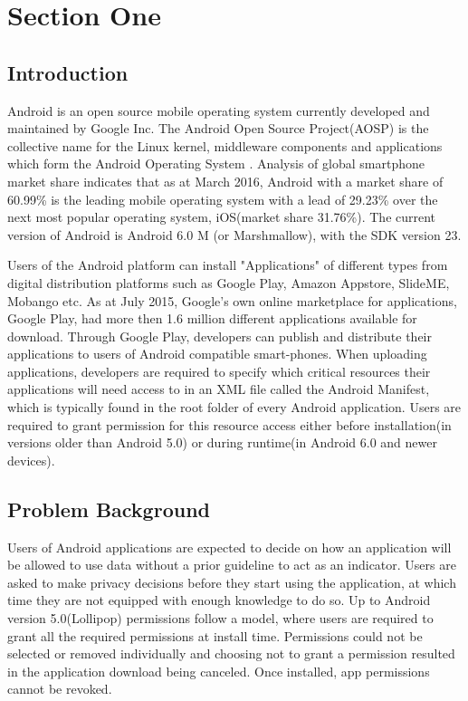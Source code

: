 

\chapter{Section One} \label{cha:intro}
\section{Introduction}
Android is an open source mobile operating system currently developed and maintained by Google Inc. The Android Open Source Project(AOSP) is the collective name for the Linux kernel, middleware components and  applications which form the Android Operating System \cite{a}. Analysis of global smartphone market share indicates that as at March 2016, Android with a market share of 60.99\% is the leading mobile operating system with a lead of 29.23\% over the next most popular operating system, iOS(market share 31.76\%)\cite{b}. The current version of Android is Android 6.0 M (or Marshmallow), with the SDK version 23. 
\smallskip

Users of the Android platform can install "Applications" of different types from digital distribution platforms such as Google Play, Amazon Appstore, SlideME, Mobango etc. As at July 2015, Google's own online marketplace for applications, Google Play, had more then 1.6 million different applications available for download\cite{mil}. Through Google Play, developers can publish and distribute their applications to users of Android compatible smart-phones. When uploading applications, developers are required to specify which critical resources their applications will need access to in an XML file called the Android Manifest, which is typically found in the root folder of every Android application. Users are required to grant permission for this resource access either before installation(in versions older than Android 5.0) or during runtime(in Android 6.0 and newer devices). 

\section{Problem Background}

Users of Android applications are expected to decide on how an application will be allowed to use data without a prior guideline to act as an indicator\cite{felt2011android}. Users are asked to make privacy decisions before they start using the application, at which time they are not equipped with enough knowledge to do so. Up to Android version 5.0(Lollipop) permissions follow a model, where users are required to grant all the required permissions at install time. Permissions could not be selected or removed individually and choosing not to grant a permission resulted in the application download being canceled. Once installed, app permissions cannot be revoked.
\smallskip 

